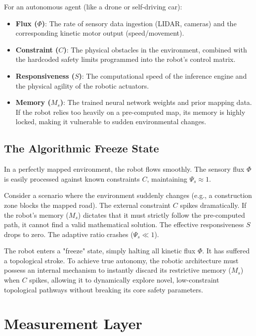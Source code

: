 \documentclass[11pt,a4paper]{article}
\begin{document}
For an autonomous agent (like a drone or self-driving car):
\begin{itemize}
    \item \textbf{Flux ($\Phi$)}: The rate of sensory data ingestion (LIDAR, cameras) and the corresponding kinetic motor output (speed/movement).
    \item \textbf{Constraint ($C$)}: The physical obstacles in the environment, combined with the hardcoded safety limits programmed into the robot's control matrix.
    \item \textbf{Responsiveness ($S$)}: The computational speed of the inference engine and the physical agility of the robotic actuators.
    \item \textbf{Memory ($M_s$)}: The trained neural network weights and prior mapping data. If the robot relies too heavily on a pre-computed map, its memory is highly locked, making it vulnerable to sudden environmental changes.
\end{itemize}

\subsection{The Algorithmic Freeze State}
In a perfectly mapped environment, the robot flows smoothly. The sensory flux $\Phi$ is easily processed against known constraints $C$, maintaining $\Psi_s \approx 1$.

Consider a scenario where the environment suddenly changes (e.g., a construction zone blocks the mapped road). The external constraint $C$ spikes dramatically. If the robot's memory ($M_s$) dictates that it must strictly follow the pre-computed path, it cannot find a valid mathematical solution. The effective responsiveness $S$ drops to zero. The adaptive ratio crashes ($\Psi_s \ll 1$).

The robot enters a "freeze" state, simply halting all kinetic flux $\Phi$. It has suffered a topological stroke. To achieve true autonomy, the robotic architecture must possess an internal mechanism to instantly discard its restrictive memory ($M_s$) when $C$ spikes, allowing it to dynamically explore novel, low-constraint topological pathways without breaking its core safety parameters.



\section{Measurement Layer}
\end{document}
